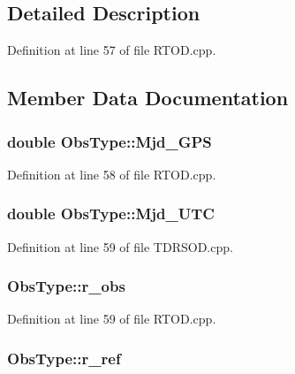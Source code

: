 \subsection{Detailed Description}


Definition at line 57 of file R\-T\-O\-D.\-cpp.



\subsection{Member Data Documentation}
\hypertarget{structObsType_aa3760b979aaa5eb0713c7ddb4ee03db0}{
\subsubsection[{Mjd\-\_\-\-G\-P\-S}]{\setlength{\rightskip}{0pt plus 5cm}double Obs\-Type\-::\-Mjd\-\_\-\-G\-P\-S}}\label{structObsType_aa3760b979aaa5eb0713c7ddb4ee03db0}


Definition at line 58 of file R\-T\-O\-D.\-cpp.

\hypertarget{structObsType_a5fea5ee9941f15d8aead3b4b44c7c096}{
\subsubsection[{Mjd\-\_\-\-U\-T\-C}]{\setlength{\rightskip}{0pt plus 5cm}double Obs\-Type\-::\-Mjd\-\_\-\-U\-T\-C}}\label{structObsType_a5fea5ee9941f15d8aead3b4b44c7c096}


Definition at line 59 of file T\-D\-R\-S\-O\-D.\-cpp.

\hypertarget{structObsType_ac05e08b6d7a68ade56df2f2833acce47}{
\subsubsection[{r\-\_\-obs}]{ Obs\-Type\-::r\-\_\-obs}}\label{structObsType_ac05e08b6d7a68ade56df2f2833acce47}


Definition at line 59 of file R\-T\-O\-D.\-cpp.

\hypertarget{structObsType_af966bcceef7dcbece45eec2265a86e12}{
\subsubsection[{r\-\_\-ref}]{ Obs\-Type\-::r\-\_\-ref}}\label{structObsType_af966bcceef7dcbece45eec2265a86e12}


